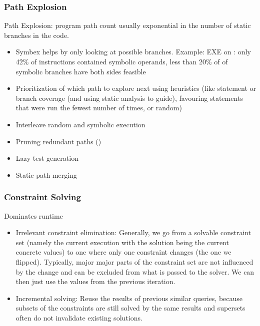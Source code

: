 \documentclass{article}
\begin{document}
\subsubsection{Path Explosion}
Path Explosion: program path count usually exponential in the number of static branches in the code.
\begin{itemize}
    \item Symbex helps by only looking at possible branches. Example: EXE\cite{EXE} on : only 42\% of instructions contained symbolic operands, less than 20\% of of symbolic branches have both sides feasible\cite{EXE}
    \item Prioritization of which path to explore next using heuristics (like statement or branch coverage (and using static analysis to guide), favouring statements that were run the fewest number of times, or random)
    \item Interleave random and symbolic execution
    \item Pruning redundant paths (\cite{RWset})
    \item Lazy test generation
    \item Static path merging
\end{itemize}

\subsubsection{Constraint Solving}
Dominates runtime
\begin{itemize}
    \item Irrelevant constraint elimination: Generally, we go from a solvable constraint set (namely the current execution with the solution being the current concrete values) to one where only one constraint changes (the one we flipped). Typically, major major parts of the constraint set are not influenced by the change and can be excluded from what is passed to the solver. We can then just use the values from the previous iteration.
    \item Incremental solving: Reuse the results of previous similar queries, because subsets of the constraints are still solved by the same results and supersets often do not invalidate existing solutions.
\end{itemize}
\end{document}
